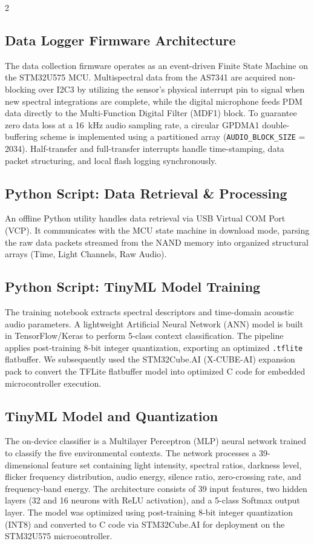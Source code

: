 \documentclass[10pt]{article}
\begin{document}
\begin{multicols}{2}
\subsection{Data Logger Firmware Architecture}
The data collection firmware operates as an event-driven Finite State Machine on the STM32U575 MCU. Multispectral data from the AS7341 are acquired non-blocking over I2C3 by utilizing the sensor's physical interrupt pin to signal when new spectral integrations are complete, while the digital microphone feeds PDM data directly to the Multi-Function Digital Filter (MDF1) block. To guarantee zero data loss at a 16~kHz audio sampling rate, a circular GPDMA1 double-buffering scheme is implemented using a partitioned array (\texttt{AUDIO\_BLOCK\_SIZE} = 2034). Half-transfer and full-transfer interrupts handle time-stamping, data packet structuring, and local flash logging synchronously.

\subsection{Python Script: Data Retrieval \& Processing}
An offline Python utility handles data retrieval via USB Virtual COM Port (VCP). It communicates with the MCU state machine in download mode, parsing the raw data packets streamed from the NAND memory into organized structural arrays (Time, Light Channels, Raw Audio).

\subsection{Python Script: TinyML Model Training}
The training notebook extracts spectral descriptors and time-domain acoustic audio parameters. A lightweight Artificial Neural Network (ANN) model is built in TensorFlow/Keras to perform 5-class context classification. The pipeline applies post-training 8-bit integer quantization, exporting an optimized \texttt{.tflite} flatbuffer. We subsequently used the STM32Cube.AI (X-CUBE-AI) expansion pack to convert the TFLite flatbuffer model into optimized C code for embedded microcontroller execution.

\subsection{TinyML Model and Quantization}
The on-device classifier is a Multilayer Perceptron (MLP) neural network trained to classify the five environmental contexts. The network processes a 39-dimensional feature set containing light intensity, spectral ratios, darkness level, flicker frequency distribution, audio energy, silence ratio, zero-crossing rate, and frequency-band energy. The architecture consists of 39 input features, two hidden layers (32 and 16 neurons with ReLU activation), and a 5-class Softmax output layer. The model was optimized using post-training 8-bit integer quantization (INT8) and converted to C code via STM32Cube.AI for deployment on the STM32U575 microcontroller.


\end{multicols}
\end{document}
